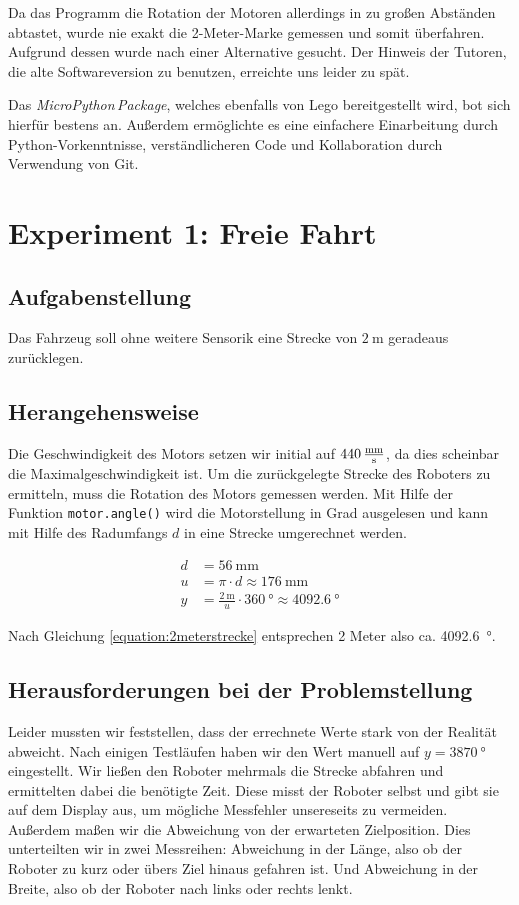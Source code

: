 \documentclass[ngerman]{tudscrreprt}
\newcommand{\code}[1]{\texttt{#1}}
\begin{document}
Da das Programm die Rotation der Motoren allerdings in zu großen Abständen abtastet,
wurde nie exakt die 2-Meter-Marke gemessen und somit überfahren. Aufgrund dessen wurde
nach einer Alternative gesucht. Der Hinweis der Tutoren, die alte Softwareversion zu
benutzen, erreichte uns leider zu spät.

Das \emph{MicroPython\,Package}, welches ebenfalls von Lego bereitgestellt wird, bot
sich hierfür bestens an. Außerdem ermöglichte es eine einfachere Einarbeitung durch
Python-Vorkenntnisse, verständlicheren Code und Kollaboration durch Verwendung von Git.


\section{Experiment 1: Freie Fahrt}
\subsection{Aufgabenstellung}
Das Fahrzeug soll ohne weitere Sensorik eine Strecke von $\SI{2}{\m}$ geradeaus
zurücklegen.

\subsection{Herangehensweise}
Die Geschwindigkeit des Motors setzen wir initial auf $\SI{440}{\frac{\mm}{\s}}$, da dies
scheinbar die Maximalgeschwindigkeit ist. Um die zurückgelegte Strecke des Roboters zu
ermitteln, muss die Rotation des Motors gemessen werden. Mit Hilfe der Funktion
\code{motor.angle()} wird die Motorstellung in Grad ausgelesen und kann mit Hilfe des
Radumfangs $d$ in eine Strecke umgerechnet werden.

\begin{equation}
    \label{equation:2meterstrecke}
    \begin{aligned}
       d &= \SI{56}{\mm}\\
       u &= \pi \cdot d \approx \SI{176}{\mm} \\
       y &= \frac{\SI{2}{\m}}{u} \cdot \SI{360}{\degree} \approx \SI{4092.6}{\degree}
    \end{aligned}
\end{equation}

Nach Gleichung \ref{equation:2meterstrecke} entsprechen 2 Meter also ca.
\SI{4092.6}{\degree}.

\subsection{Herausforderungen bei der Problemstellung}
Leider mussten wir feststellen, dass der errechnete Werte stark von der Realität abweicht.
Nach einigen Testläufen haben wir den Wert manuell auf $y = \SI{3870}{\degree}$ eingestellt.
Wir ließen den Roboter mehrmals die Strecke abfahren und ermittelten dabei die benötigte
Zeit. Diese misst der Roboter selbst und gibt sie auf dem Display aus, um mögliche
Messfehler unsereseits zu vermeiden. Außerdem maßen wir die Abweichung von der
erwarteten Zielposition. Dies unterteilten wir in zwei Messreihen: Abweichung in der
Länge, also ob der Roboter zu kurz oder übers Ziel hinaus gefahren ist. Und Abweichung in
der Breite, also ob der Roboter nach links oder rechts lenkt.
\end{document}
